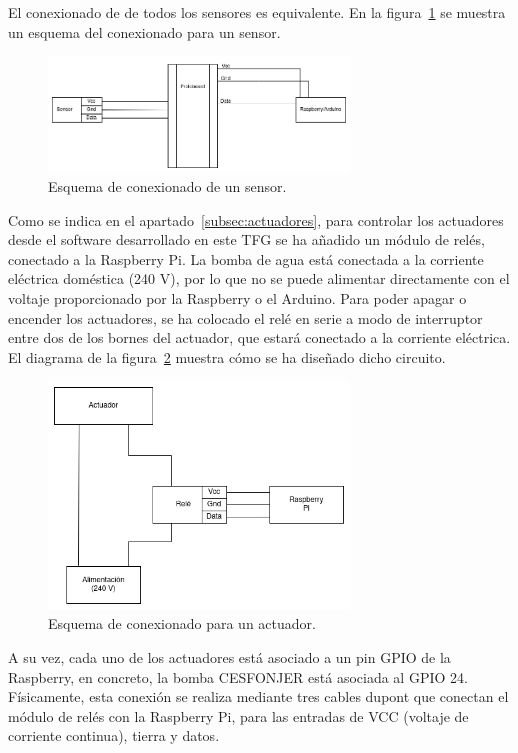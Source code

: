 \documentclass[a4paper, 12pt, oneside]{book}
\begin{document}
El conexionado de de todos los sensores es equivalente. En la figura~\ref{figura:conexion_sensor} se muestra un esquema del conexionado para un sensor.
\begin{figure}[H]
	\centering
    \includegraphics[width=8cm, keepaspectratio]{img/conexion_sensor}
    \caption{Esquema de conexionado de un sensor.}
    \label{figura:conexion_sensor}
\end{figure}


Como se indica en el apartado~\ref{subsec:actuadores}, para controlar los actuadores desde el software desarrollado en este TFG se ha añadido un módulo de relés, conectado a la Raspberry Pi. La bomba de agua está conectada a la corriente eléctrica doméstica (240 V), por lo que no se puede alimentar directamente con el voltaje proporcionado por la Raspberry o el Arduino. Para poder apagar o encender los actuadores, se ha colocado el relé en serie a modo de interruptor entre dos de los bornes del actuador, que estará conectado a la corriente eléctrica.
El diagrama de la figura~\ref{figura:circuito_reles} muestra cómo se ha diseñado dicho circuito.

\begin{figure}[H]
	\centering
    \includegraphics[width=8cm, keepaspectratio]{img/circuito_reles}
    \caption{Esquema de conexionado para un actuador.}
    \label{figura:circuito_reles}
\end{figure}

A su vez, cada uno de los actuadores está asociado a un pin GPIO de la Raspberry, en concreto, la bomba CESFONJER está asociada al GPIO 24. Físicamente, esta conexión se realiza mediante tres cables dupont que conectan el módulo de relés con la Raspberry Pi, para las entradas de VCC (voltaje de corriente continua), tierra y datos.
\end{document}
